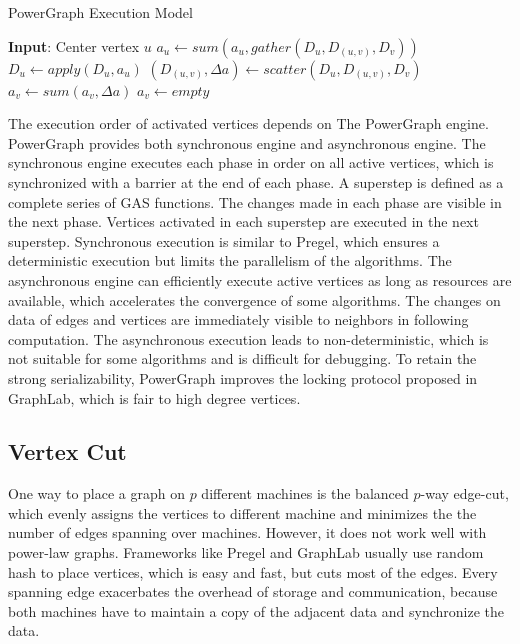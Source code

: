 	\begin{Algorithmus}[H]
	\label{alg:PowerGraphExecutionModel}
	\caption{PowerGraph Execution Model}	
	\begin{algorithmic}[1]
	\State \textbf{Input}: Center vertex $u$
			\State $a_u \leftarrow sum(a_u,gather(D_u,D_{(u,v)},D_v))$
		\EndFor
	\EndIf
	\State $D_u \leftarrow apply(D_u,a_u)$
		\State $(D_{(u,v)}, \Delta a) \leftarrow scatter(D_u,D_{(u,v)},D_v)$
			\State $a_v \leftarrow sum(a_v, \Delta a)$
		\Else
			\State $a_v \leftarrow empty$
		\EndIf
	\EndFor	
	\end{algorithmic}	
	\end{Algorithmus}

The execution order of activated vertices depends on The PowerGraph engine. PowerGraph provides both synchronous engine and asynchronous engine. The synchronous engine executes each phase in order on all active vertices, which is synchronized with a barrier at the end of each phase. A superstep is defined as a complete series of GAS functions. The changes made in each phase are visible in the next phase. Vertices activated in each superstep are executed in the next superstep. Synchronous execution is similar to Pregel, which ensures a deterministic execution but limits the parallelism of the algorithms. The asynchronous engine can efficiently execute active vertices as long as resources are available, which accelerates the convergence of some algorithms. The changes on data of edges and vertices are immediately visible to neighbors in following computation. The asynchronous execution leads to non-deterministic, which is not suitable for some algorithms and is difficult for debugging. To retain the strong serializability, PowerGraph improves the locking protocol proposed in GraphLab, which is fair to high degree vertices. 

\subsection{Vertex Cut}

One way to place a graph on $p$ different machines is the balanced $p$-way edge-cut, which evenly assigns the vertices to different machine and minimizes the the number of edges spanning over machines. However, it does not work well with power-law graphs. Frameworks like Pregel and GraphLab usually use random hash to place vertices, which is easy and fast, but cuts most of the edges. Every spanning edge exacerbates the overhead of storage and communication, because both machines have to maintain a copy of the adjacent data and synchronize the data.

